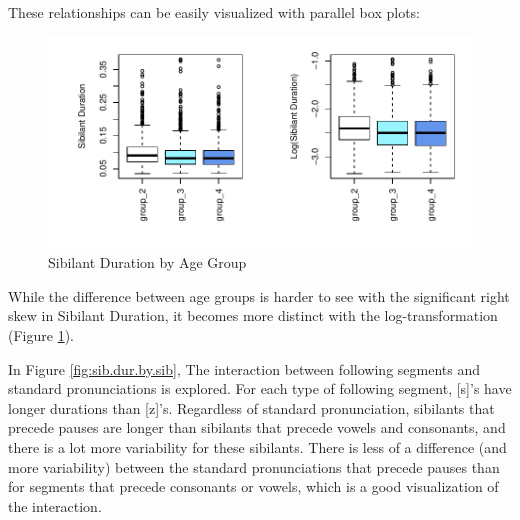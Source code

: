 \documentclass[a4paper]{article}
\begin{document}
These relationships can be easily visualized with parallel box plots:
\vspace{-10pt}
\begin{figure}[h!]
  \begin{center}
    \begin{minipage}[t]{\linewidth}
      \begin{center}
\includegraphics{prelim-059}
      \end{center}
    \end{minipage}
    \caption{Sibilant Duration by Age Group}
    \label{fig:sib.dur.by.age}
  \end{center}
\end{figure}

While the difference between age groups is harder to see with the
significant right skew in Sibilant Duration, it becomes more distinct with
the log-transformation (Figure \ref{fig:sib.dur.by.age}).

In Figure \ref{fig:sib.dur.by.sib}, The interaction between following
segments and standard pronunciations is explored.
For each type of following segment, [s]'s have longer durations than
[z]'s.  Regardless of standard pronunciation, sibilants that precede
pauses are longer than sibilants that precede vowels and consonants,
and there is a lot more variability for these sibilants.  There is
less of a difference (and more variability) between the standard
pronunciations that precede  pauses than for segments that precede
consonants or vowels, which is a good visualization of
the interaction.
\end{document}
